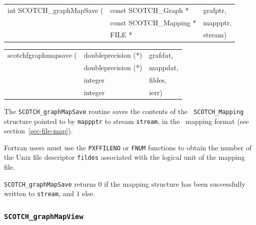 \begin{itemize}
\progsyn

{\tt\begin{tabular}{l@{}ll}
int SCOTCH\_graphMapSave ( & const SCOTCH\_Graph *   & grafptr, \\
                           & const SCOTCH\_Mapping * & mappptr, \\
                           & FILE *                  & stream)
\end{tabular}}

{\tt\begin{tabular}{l@{}ll}
scotchfgraphmapsave ( & doubleprecision (*) & grafdat, \\
                      & doubleprecision (*) & mappdat, \\
                      & integer             & fildes,  \\
                      & integer             & ierr)
\end{tabular}}

\progdes

The {\tt SCOTCH\_graphMapSave} routine saves the contents of the {\tt
SCOTCH\_\lbt Mapping} structure pointed to by {\tt mappptr} to stream
{\tt stream}, in the \scotch\ mapping format (see
section~\ref{sec-file-map}).

Fortran users must use the {\tt PXFFILENO} or {\tt FNUM} functions to
obtain the number of the Unix file descriptor {\tt fildes} associated
with the logical unit of the mapping file.

\progret

{\tt SCOTCH\_graphMapSave} returns $0$ if the mapping structure
has been successfully written to {\tt stream}, and $1$ else.
\end{itemize}

\subsubsection{{\tt SCOTCH\_graphMapView}}

